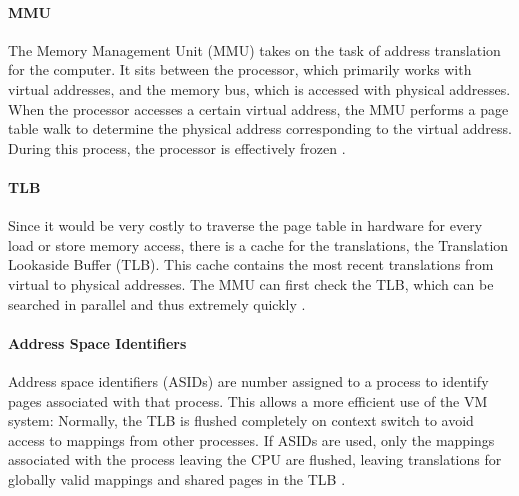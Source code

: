 
\paragraph{MMU}
The Memory Management Unit (MMU) takes on the task of address translation for the computer.
It sits between the processor, which primarily works with virtual addresses, and the memory bus,
which is accessed with physical addresses. When the processor accesses a certain virtual address,
the MMU performs a page table walk to determine the physical address corresponding to the virtual
address. During this process, the processor is effectively frozen \cite{jacobVirtualMemoryContemporary1998}.


\paragraph{TLB} Since it would be very costly to traverse the page table in hardware for every load or store memory access, there is a cache for the translations, the Translation Lookaside Buffer (TLB). This cache contains the most recent translations from virtual to physical addresses. The MMU can first check the TLB, which can be searched in parallel and thus extremely quickly \cite{drepper2007every,jacobVirtualMemoryContemporary1998}.




\paragraph{Address Space Identifiers}
Address space identifiers (ASIDs) are number assigned to a process to identify pages associated with that process. This allows a more efficient use of the VM system: Normally, the TLB is flushed completely on context switch to avoid access to mappings from other processes. If ASIDs are used, only the mappings associated with the process leaving the CPU are flushed, leaving translations for globally valid mappings and shared pages in the TLB \cite{RISCVInstructionSet}.

